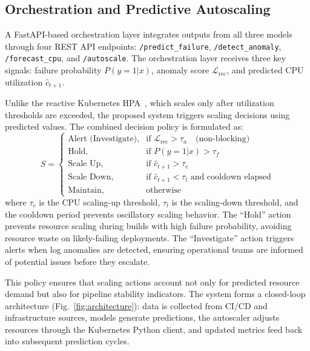 \documentclass[sn-nature]{sn-jnl}
\theoremstyle{thmstyleone}
\theoremstyle{thmstyletwo}
\theoremstyle{thmstylethree}
\begin{document}
\subsection{Orchestration and Predictive Autoscaling}\label{subsec:orchestration}

A FastAPI-based orchestration layer integrates outputs from all three models through four REST API endpoints: \texttt{/predict\_failure}, \texttt{/detect\_anomaly}, \texttt{/forecast\_cpu}, and \texttt{/autoscale}. The orchestration layer receives three key signals: failure probability $P(y=1|x)$, anomaly score $\mathcal{L}_{\mathrm{rec}}$, and predicted CPU utilization $\hat{c}_{t+1}$.

Unlike the reactive Kubernetes HPA~\cite{kubernetesDocs}, which scales only after utilization thresholds are exceeded, the proposed system triggers scaling decisions using predicted values. The combined decision policy is formulated as:
\begin{equation}\label{eq:policy}
S =
\begin{cases}
\text{Alert (Investigate)}, & \text{if } \mathcal{L}_{\mathrm{rec}} > \tau_a \quad \text{(non-blocking)} \\
\text{Hold}, & \text{if } P(y=1|x) > \tau_f \\
\text{Scale Up}, & \text{if } \hat{c}_{t+1} > \tau_c \\
\text{Scale Down}, & \text{if } \hat{c}_{t+1} < \tau_l \text{ and cooldown elapsed} \\
\text{Maintain}, & \text{otherwise}
\end{cases}
\end{equation}
where $\tau_c$ is the CPU scaling-up threshold, $\tau_l$ is the scaling-down threshold, and the cooldown period prevents oscillatory scaling behavior. The ``Hold'' action prevents resource scaling during builds with high failure probability, avoiding resource waste on likely-failing deployments. The ``Investigate'' action triggers alerts when log anomalies are detected, ensuring operational teams are informed of potential issues before they escalate.

This policy ensures that scaling actions account not only for predicted resource demand but also for pipeline stability indicators. The system forms a closed-loop architecture (Fig.~\ref{fig:architecture}): data is collected from CI/CD and infrastructure sources, models generate predictions, the autoscaler adjusts resources through the Kubernetes Python client, and updated metrics feed back into subsequent prediction cycles.
\end{document}
